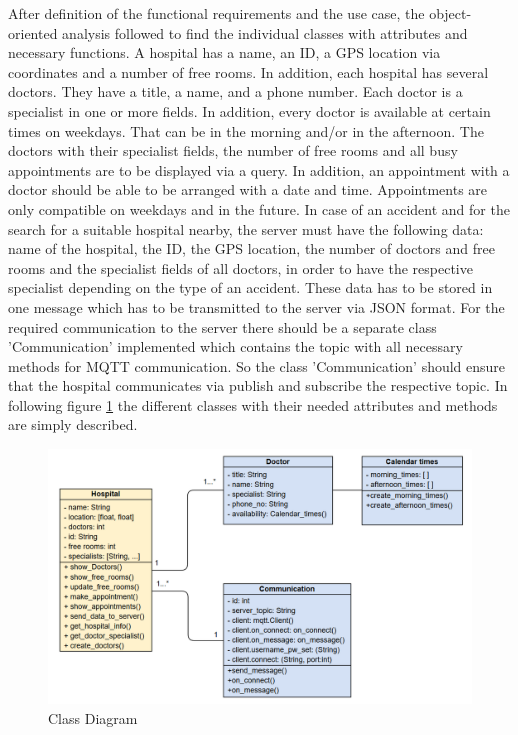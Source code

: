 After definition of the functional requirements and the use case, the object-oriented analysis followed to find the individual classes with attributes and necessary functions. 
A hospital has a name, an ID, a GPS location via coordinates and a number of free rooms. In addition, each hospital has several doctors. They have a title, a name, and a phone number. Each doctor is a specialist in one or more fields. In addition, every doctor is available at certain times on weekdays. That can be in the morning and/or in the afternoon. The doctors with their specialist fields, the number of free rooms and all busy appointments are to be displayed via a query. In addition, an appointment with a doctor should be able to be arranged with a date and time. Appointments are only compatible on weekdays and in the future. In case of an accident and for the search for a suitable hospital nearby, the server must have the following data: name of the hospital, the ID, the GPS location, the number of doctors and free rooms and the specialist fields of all doctors, in order to have the respective specialist depending on the type of an accident. These data has to be stored in one message which has to be transmitted to the server via JSON format. 
For the required communication to the server there should be a separate class 'Communication' implemented which contains the topic with all necessary methods for MQTT communication. So the class 'Communication' should ensure that the hospital communicates via publish and subscribe the respective topic. 
In following figure \ref{Class_diagram} the different classes with their needed attributes and methods are simply described.

\begin{figure}
\centering
\sidecaption
\includegraphics[scale=.425]{images/melanie_images/Class_model.png}
\caption{Class Diagram}
\label{Class_diagram}
\end{figure}

